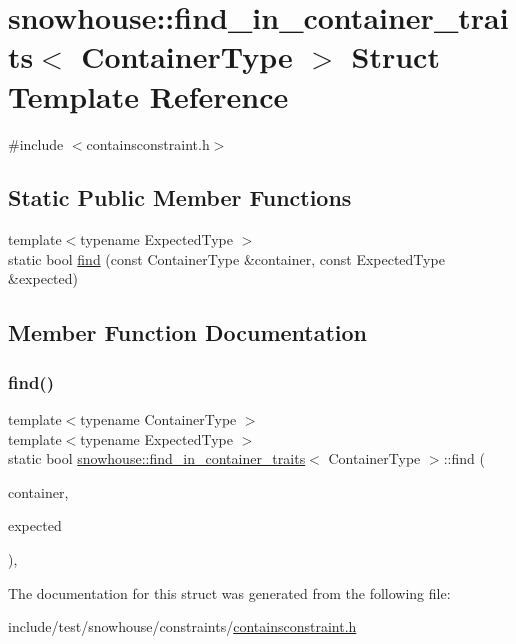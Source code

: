 \hypertarget{structsnowhouse_1_1find__in__container__traits}{}\section{snowhouse\+::find\+\_\+in\+\_\+container\+\_\+traits$<$ Container\+Type $>$ Struct Template Reference}
\label{structsnowhouse_1_1find__in__container__traits}


{\ttfamily \#include $<$containsconstraint.\+h$>$}

\subsection*{Static Public Member Functions}
\begin{DoxyCompactItemize}
\item 
{\footnotesize template$<$typename Expected\+Type $>$ }\\static bool \mbox{\hyperlink{structsnowhouse_1_1find__in__container__traits_a8f739c4ced451181c4d8e893556c4d55}{find}} (const Container\+Type \&container, const Expected\+Type \&expected)
\end{DoxyCompactItemize}


\subsection{Member Function Documentation}
\mbox{\label{structsnowhouse_1_1find__in__container__traits_a8f739c4ced451181c4d8e893556c4d55}} 
\subsubsection{\texorpdfstring{find()}{find()}}
{\footnotesize\ttfamily template$<$typename Container\+Type $>$ \\
template$<$typename Expected\+Type $>$ \\
static bool \mbox{\hyperlink{structsnowhouse_1_1find__in__container__traits}{snowhouse\+::find\+\_\+in\+\_\+container\+\_\+traits}}$<$ Container\+Type $>$\+::find (\begin{DoxyParamCaption}\item[{const Container\+Type \&}]{container,  }\item[{const Expected\+Type \&}]{expected }\end{DoxyParamCaption})\hspace{0.3cm}{\ttfamily [inline]}, {\ttfamily [static]}}



The documentation for this struct was generated from the following file\+:\begin{DoxyCompactItemize}
\item 
include/test/snowhouse/constraints/\mbox{\hyperlink{containsconstraint_8h}{containsconstraint.\+h}}\end{DoxyCompactItemize}

